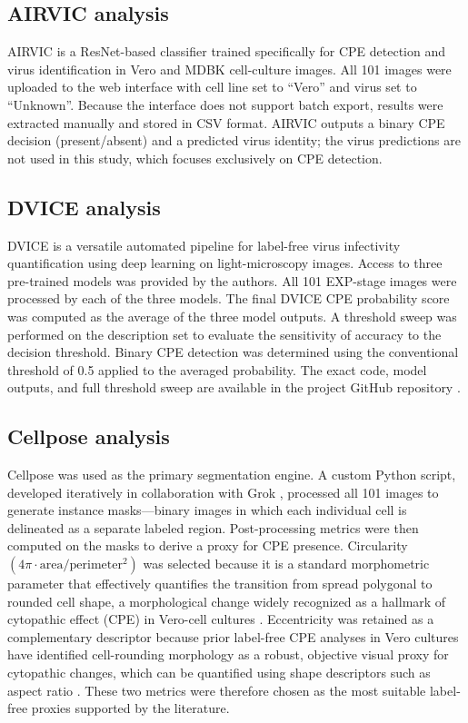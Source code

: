 \documentclass[12pt,a4paper]{article}
\begin{document}


\subsection{AIRVIC analysis}
AIRVIC \cite{airvic} is a ResNet-based classifier trained specifically for CPE detection and virus identification in Vero and MDBK cell-culture images. All 101 images were uploaded to the web interface \cite{airvicweb} with cell line set to ``Vero'' and virus set to ``Unknown''. Because the interface does not support batch export, results were extracted manually and stored in CSV format. AIRVIC outputs a binary CPE decision (present/absent) and a predicted virus identity; the virus predictions are not used in this study, which focuses exclusively on CPE detection.

\subsection{DVICE analysis}
DVICE \cite{dvice} is a versatile automated pipeline for label-free virus infectivity quantification using deep learning on light-microscopy images. Access to three pre-trained models was provided by the authors. All 101 EXP-stage images were processed by each of the three models. The final DVICE CPE probability score was computed as the average of the three model outputs. A threshold sweep was performed on the description set to evaluate the sensitivity of accuracy to the decision threshold. Binary CPE detection was determined using the conventional threshold of 0.5 applied to the averaged probability. The exact code, model outputs, and full threshold sweep are available in the project GitHub repository \cite{github-verocell}.

\subsection{Cellpose analysis}
Cellpose \cite{cellpose} was used as the primary segmentation engine. A custom Python script, developed iteratively in collaboration with Grok \cite{llms}, processed all 101 images to generate instance masks---binary images in which each individual cell is delineated as a separate labeled region. Post-processing metrics were then computed on the masks to derive a proxy for CPE presence. Circularity \((4\pi \cdot \text{area} / \text{perimeter}^2)\) was selected because it is a standard morphometric parameter that effectively quantifies the transition from spread polygonal to rounded cell shape, a morphological change widely recognized as a hallmark of cytopathic effect (CPE) in Vero-cell cultures \cite{pmc11180103}. Eccentricity was retained as a complementary descriptor because prior label-free CPE analyses in Vero cultures have identified cell-rounding morphology as a robust, objective visual proxy for cytopathic changes, which can be quantified using shape descriptors such as aspect ratio \cite{revvity}. These two metrics were therefore chosen as the most suitable label-free proxies supported by the literature.
\end{document}

